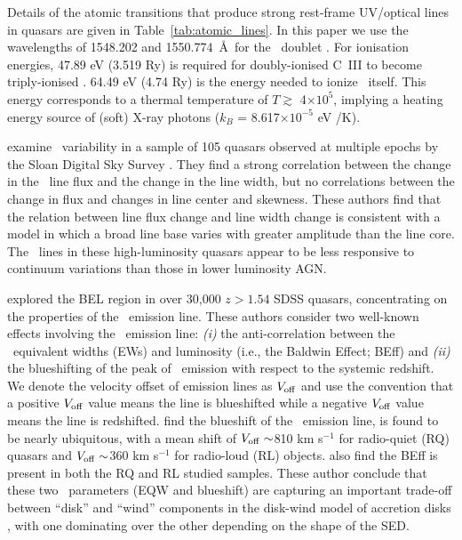 \documentclass[a4paper,fleqn,usenatbib]{mnras}
\begin{document}
Details of the atomic transitions that produce strong rest-frame
UV/optical lines in quasars are given in
Table~\ref{tab:atomic_lines}. In this paper we use the wavelengths of
1548.202 and 1550.774~\AA\ for the \civ\ doublet
\citep{Kramida2018}. For ionisation energies, 47.89 eV (3.519 Ry) is
required for doubly-ionised C~III to become triply-ionised \civ.
64.49 eV (4.74 Ry) is the energy needed to ionize \civ\ itself. This
energy corresponds to a thermal temperature of $T \gtrsim$
4$\times10^{5}$, implying a heating energy source of (soft) X-ray
photons ($k_{B}$ = 8.617$\times 10^{-5}$ eV /K).

\citet{Wilhite2006} examine \civ\ variability in a sample
of 105 quasars observed at multiple epochs by the Sloan Digital Sky
Survey \citep[SDSS;][]{York2000, Stoughton2002, Abazajian2009}.  They
find a strong correlation between the change in the \civ\ line
flux and the change in the line width, but no correlations between the
change in flux and changes in line center and skewness.  These authors
find that the relation between line flux change and line width change
is consistent with a model in which a broad line base varies with
greater amplitude than the line core. The \civ\ lines in these
high-luminosity quasars appear to be less responsive to continuum
variations than those in lower luminosity AGN.

\citet{Richards2011} explored the BEL region in over 30,000 $z > 1.54$
SDSS quasars, concentrating on the properties of the \civ\ emission
line. These authors consider two well-known effects involving the
\civ\ emission line: {\it (i)} the anti-correlation between the \civ\
equivalent widths (EWs) and luminosity (i.e., the Baldwin Effect;
BEff) and {\it (ii)} the blueshifting of the peak of \civ\ emission
with respect to the systemic redshift.  We denote the velocity offset
of emission lines as $V_{\rm off}$ and use the convention that a
positive $V_{\rm off}$ value means the line is blueshifted while a
negative $V_{\rm off}$ value means the line is redshifted.
\citet{Richards2011} find the blueshift of the \civ\ emission line, is
found to be nearly ubiquitous, with a mean shift of $V_{\rm off}
\sim$810 km s$^{-1}$ for radio-quiet (RQ) quasars and $V_{\rm off}
\sim$360 km s$^{-1}$ for radio-loud (RL) objects. \citet{Richards2011}
also find the BEff is present in both the RQ and RL studied samples.
These author conclude that these two \civ\ parameters (EQW and
blueshift) are capturing an important trade-off between ``disk'' and
``wind'' components in the disk-wind model of accretion disks
\citep[e.g.,][]{Murray1995, Elvis2000, Proga2000, Leighly2004b}, with
one dominating over the other depending on the shape of the SED.
\end{document}
